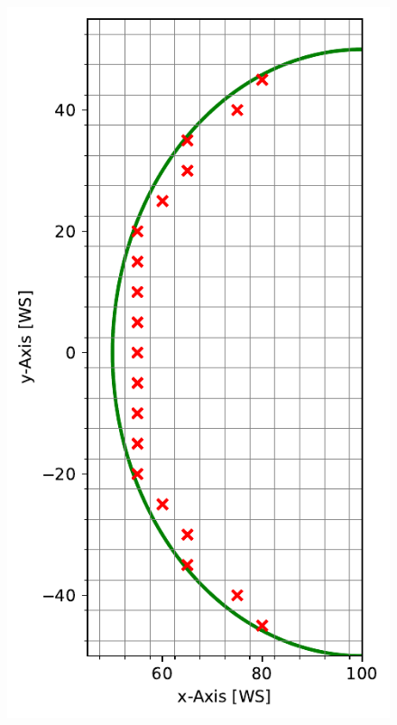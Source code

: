 \begin{figure}[h]
	  \includegraphics[width=\linewidth]{res/intersection.pdf}
	\endminipage\hfill

\end{figure}
